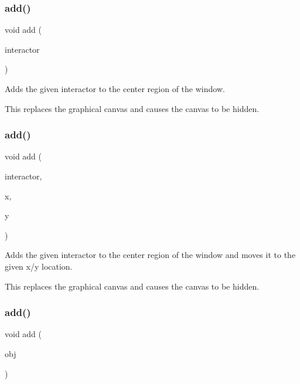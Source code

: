 \subsubsection{\texorpdfstring{add()}{add()}\hspace{0.1cm}{\footnotesize\ttfamily [3/8]}}
{\footnotesize\ttfamily void add (\begin{DoxyParamCaption}\item[{\mbox{\hyperlink{classsgl_1_1GInteractor}{G\+Interactor}} \&}]{interactor }\end{DoxyParamCaption})\hspace{0.3cm}{\ttfamily [virtual]}}



Adds the given interactor to the center region of the window. 

This replaces the graphical canvas and causes the canvas to be hidden. \mbox{\label{classsgl_1_1GWindow_a56840f453f9938083c24c7fb1a4c377e}} 
\subsubsection{\texorpdfstring{add()}{add()}\hspace{0.1cm}{\footnotesize\ttfamily [4/8]}}
{\footnotesize\ttfamily void add (\begin{DoxyParamCaption}\item[{\mbox{\hyperlink{classsgl_1_1GInteractor}{G\+Interactor}} \&}]{interactor,  }\item[{double}]{x,  }\item[{double}]{y }\end{DoxyParamCaption})\hspace{0.3cm}{\ttfamily [virtual]}}



Adds the given interactor to the center region of the window and moves it to the given x/y location. 

This replaces the graphical canvas and causes the canvas to be hidden. \mbox{\label{classsgl_1_1GWindow_a2327d64402837eedd533c098014e46d9}} 
\subsubsection{\texorpdfstring{add()}{add()}\hspace{0.1cm}{\footnotesize\ttfamily [5/8]}}
{\footnotesize\ttfamily void add (\begin{DoxyParamCaption}\item[{\mbox{\hyperlink{classsgl_1_1GObject}{G\+Object}} $\ast$}]{obj }\end{DoxyParamCaption})\hspace{0.3cm}{\ttfamily [virtual]}}




